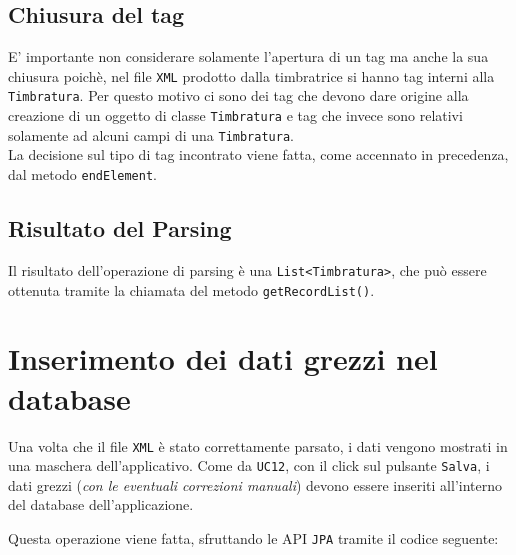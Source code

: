 \subsection{Chiusura del tag}
E' importante non considerare solamente l'apertura di un tag ma anche la sua chiusura poichè, nel file \verb|XML| prodotto dalla timbratrice si hanno tag interni alla \verb|Timbratura|. Per questo motivo ci sono dei tag che devono dare origine alla creazione di un oggetto di classe \verb|Timbratura| e tag che invece sono relativi solamente ad alcuni campi di una \verb|Timbratura|.	\\
La decisione sul tipo di tag incontrato viene fatta, come accennato in precedenza, dal metodo \verb|endElement|.  
\lstset{
    caption=Metodo endElement
 }

\subsection{Risultato del Parsing}
Il risultato dell'operazione di parsing è una \verb|List<Timbratura>|, che può essere ottenuta tramite la chiamata del metodo \verb|getRecordList()|.
\lstset{
    caption=Metodo getRecordList
 }

\section{Inserimento dei dati grezzi nel database}
Una volta che il file \verb|XML| è stato correttamente parsato, i dati vengono mostrati in una maschera dell'applicativo.
\noindent
Come da \verb|UC12|, con il click sul pulsante \verb|Salva|, i dati grezzi (\textit{con le eventuali correzioni manuali}) devono essere inseriti all'interno del database dell'applicazione.

\noindent
Questa operazione viene fatta, sfruttando le API \verb|JPA| tramite il codice seguente:
\lstset{
    caption=Salvataggio dei dati grezzi provenienti dalla timbratrice
 }
